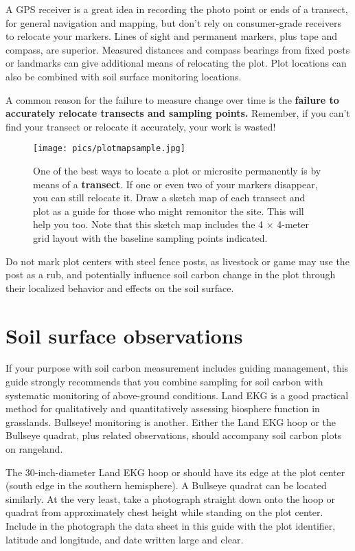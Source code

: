 \documentclass[11pt,letterpaper,oneside,onecolumn]{memoir}
\begin{document}
A GPS receiver is a great idea in recording the photo point or ends of a transect, for general navigation and mapping, but don't rely on consumer-grade receivers to relocate your markers. Lines of sight and permanent markers, plus tape and compass, are superior. Measured distances and compass bearings from fixed posts or landmarks can give additional means of relocating the plot. Plot locations can also be combined with soil surface monitoring locations.

A common reason for the failure to measure change over time is the \textbf{failure to accurately relocate transects and sampling points.} Remember, if you can't find your transect or relocate it accurately, your work is wasted!


\begin{figure}
\centering
\texttt{[image: pics/plotmapsample.jpg]}
\caption{One of the best ways to locate a plot or microsite permanently is by means of a \textbf{transect}.  If one or even two of your markers disappear, you can still relocate it. Draw a sketch map of each transect and plot as a guide for those who might remonitor the site. This will help you too. Note that this sketch map includes the 4 $\times$ 4-meter grid layout with the baseline sampling points indicated.}
\end{figure}


Do not mark plot centers with steel fence posts, as livestock or game may use the post as a rub, and potentially influence soil carbon change in the plot through their localized behavior and effects on the soil surface.


\section{Soil surface observations}

If your purpose with soil carbon measurement includes guiding management, this guide strongly recommends that you combine sampling for soil carbon with systematic monitoring of above-ground conditions. Land EKG  is a good practical method for qualitatively and quantitatively assessing biosphere function in grasslands. Bullseye! monitoring is another. Either the Land EKG hoop or the Bullseye quadrat, plus related observations, should accompany soil carbon plots on rangeland.

The 30-inch-diameter Land EKG hoop or should have its edge at the plot center (south edge in the southern hemisphere). A Bullseye quadrat can be located similarly. At the very least, take a photograph straight down onto the hoop or quadrat from approximately chest height while standing on the plot center. Include in the photograph the data sheet in this guide with the plot identifier, latitude and longitude, and date written large and clear.
\end{document}
